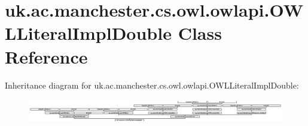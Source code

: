 \hypertarget{classuk_1_1ac_1_1manchester_1_1cs_1_1owl_1_1owlapi_1_1_o_w_l_literal_impl_double}{\section{uk.\-ac.\-manchester.\-cs.\-owl.\-owlapi.\-O\-W\-L\-Literal\-Impl\-Double Class Reference}
\label{classuk_1_1ac_1_1manchester_1_1cs_1_1owl_1_1owlapi_1_1_o_w_l_literal_impl_double}
}
Inheritance diagram for uk.\-ac.\-manchester.\-cs.\-owl.\-owlapi.\-O\-W\-L\-Literal\-Impl\-Double\-:\begin{figure}[H]
\begin{center}
\leavevmode
\includegraphics[height=1.028466cm]{classuk_1_1ac_1_1manchester_1_1cs_1_1owl_1_1owlapi_1_1_o_w_l_literal_impl_double}
\end{center}
\end{figure}
